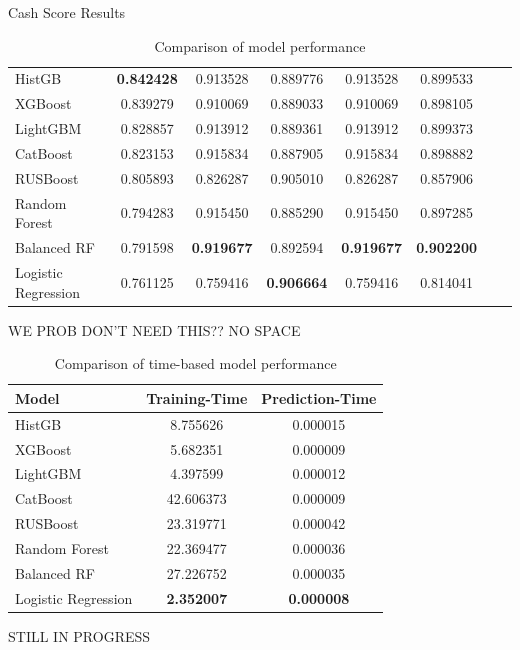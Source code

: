 \documentclass[final]{beamer}
\newlength{\colwidth}
\begin{document}
\begin{frame}[t]
\begin{columns}[t]
\begin{column}{\colwidth}
\begin{exampleblock}{Cash Score Results}
\begin{table}[H]
\begin{tabular}{|l|c|c|c|c|c|c|c|}
        HistGB & \textbf{0.842428} & 0.913528 & 0.889776 & 0.913528 & 0.899533 \\
        XGBoost & 0.839279 & 0.910069 & 0.889033 & 0.910069 & 0.898105 \\
        LightGBM & 0.828857 & 0.913912 & 0.889361 & 0.913912 & 0.899373 \\
        CatBoost & 0.823153 & 0.915834 & 0.887905 & 0.915834 & 0.898882 \\
        RUSBoost & 0.805893 & 0.826287 & 0.905010 & 0.826287 & 0.857906 \\
        Random Forest & 0.794283 & 0.915450 & 0.885290 & 0.915450 & 0.897285 \\
        Balanced RF & 0.791598 & \textbf{0.919677} & 0.892594 & \textbf{0.919677} & \textbf{0.902200} \\
        Logistic Regression & 0.761125 & 0.759416 & \textbf{0.906664} & 0.759416 & 0.814041 \\
        \hline
    \end{tabular}
    \caption{Comparison of model performance}
    \end{table}

WE PROB DON'T NEED THIS?? NO SPACE
    \begin{table}[H]
    \centering
    \begin{tabular}{|l|c|c|}
        \hline
        Model & Training-Time & Prediction-Time\\
        \hline

        HistGB & 8.755626 & 0.000015 \\
        XGBoost & 5.682351 & 0.000009 \\
        LightGBM & 4.397599 & 0.000012 \\
        CatBoost & 42.606373 & 0.000009 \\
        RUSBoost & 23.319771 & 0.000042 \\
        Random Forest & 22.369477 & 0.000036 \\
        Balanced RF & 27.226752 & 0.000035 \\
        Logistic Regression & \textbf{2.352007} & \textbf{0.000008} \\
        \hline
    \end{tabular}
    \caption{Comparison of time-based model performance}
    \label{tab:time_performance}
\end{table}

    STILL IN PROGRESS

  \end{exampleblock}


\end{column}
\end{columns}
\end{frame}
\end{document}
